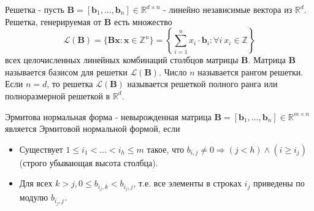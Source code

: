 Решетка - пусть $ \mathbf{B} = [\mathbf{b}_1, ..., \mathbf{b}_n] \in \mathbb{R}^{d \times n} $ - линейно независимые вектора из $ \mathbb{R}^d $. Решетка, генерируемая от $\mathbf{B}$ есть множество $$ \mathcal{L}(\mathbf{B}) = \lbrace \mathbf{Bx}: \mathbf{x} \in \mathbb{Z}^n \rbrace = \left\{ \sum\limits_{i=1}^n x_i \cdot \mathbf{b}_i: \forall i \ x_i \in \mathbb{Z} \right\} $$
всех целочисленных линейных комбинаций столбцов матрицы $\mathbf{B}$. Матрица $\mathbf{B}$ называется базисом для решетки $\mathcal{L}(\mathbf{B})$. Число $n$ называется рангом решетки. Если $n = d$, то решетка $\mathcal{L}(\mathbf{B})$ называется решеткой полного ранга или полноразмерной решеткой в $\mathbb{R}^d$.

Эрмитова нормальная форма - невырожденная матрица $ \mathbf{B}=\left[\mathbf{b}_1, \ldots, \mathbf{b}_n\right] \in \mathbb{R}^{m \times n}\ $ является Эрмитовой нормальной формой, если

\begin{itemize}
\item Существует $ 1 \le i_1 < \ldots < i_h \le m $ такое, что $ b_{i,j} \neq 0 \Rightarrow (j < h) \land (i \geq i_j) $ (строго убывающая высота столбца).
\item Для всех $ k>j, 0 \le b_{{i_j,k}}<b_{i_j,j} $, т.е. все элементы в строках $ i_j $ приведены по модулю $ b_{i_j, j} $.
\end{itemize}


\clearpage